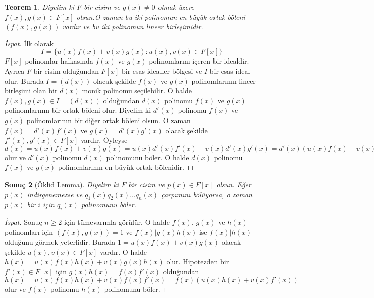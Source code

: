 \documentclass{article}
\newtheorem{thm}{Teorem}[section]
\newtheorem{cor}[thm]{Sonuç}
\theoremstyle{definition}
\theoremstyle{remark}
\begin{document}
    		\begin{thm}
    		    Diyelim ki $F$ bir cisim ve $g(x) \neq 0$ olmak üzere $f(x), g(x) \in F[x]$ olsun.O zaman bu iki polinomun en büyük ortak böleni $(f(x), g(x))$ vardır ve bu iki polinomun lineer birleşimidir.
    		\end{thm}
    		
    		\begin{proof}[İspat]
    		    İlk olarak
    		    \begin{equation*}
    		        I = \{u(x)f(x) + v(x)g(x) : u(x), v(x) \in F[x]\}
    		    \end{equation*}
    		    $F[x]$ polinomlar halkasında $f(x)$ ve $g(x)$ polinomlarını içeren bir idealdir. Ayrıca $F$ bir cisim olduğundan $F[x]$ bir esas idealler bölgesi ve $I$ bir esas ideal olur. Burada $I = (d(x))$ olacak şekilde $f(x)$ ve $g(x)$ polinomlarının lineer birleşimi olan bir $d(x)$ monik polinomu seçilebilir. O halde $f(x), g(x) \in I = (d(x))$ olduğundan $d(x)$ polinomu $f(x)$ ve $g(x)$ polinomlarının bir ortak böleni olur. Diyelim ki $d'(x)$ polinomu $f(x)$ ve $g(x)$ polinomlarının bir diğer ortak böleni olsun. O zaman $f(x) = d'(x)f'(x)$ ve $g(x) = d'(x)g'(x)$ olacak şekilde $f'(x), g'(x) \in F[x]$ vardır. Öyleyse $d(x) = u(x)f(x) + v(x)g(x) = u(x)d'(x)f'(x) + v(x)d'(x)g'(x) = d'(x)(u(x)f(x) + v(x)g(x))$ olur ve $d'(x)$ polinomu $d(x)$ polinomunu böler. O halde $d(x)$ polinomu $f(x)$ ve $g(x)$ polinomlarının en büyük ortak bölenidir.
    		\end{proof}
    		
    		\begin{cor}[Öklid Lemma]\label{2.6}
    		    Diyelim ki $F$ bir cisim ve $p(x) \in F[x]$ olsun. Eğer $p(x)$ indirgenemezse ve $q_1(x) q_2(x) \dots q_n(x)$ çarpımını bölüyorsa, o zaman $p(x)$ bir $i$ için $q_i(x)$ polinomunu böler.
    		\end{cor}
    		
    		\begin{proof}[İspat]
    		    Sonuç $n \geq 2$ için tümevarımla görülür. O halde $f(x)$, $g(x)$ ve $h(x)$ polinomları için $(f(x), g(x)) = 1$ ve $f(x) | g(x)h(x)$ ise $f(x) | h(x)$ olduğunu görmek yeterlidir. Burada $1 = u(x)f(x) + v(x)g(x)$ olacak şekilde $u(x), v(x) \in F[x]$ vardır. O halde $h(x) = u(x)f(x)h(x) + v(x)g(x)h(x)$ olur. Hipotezden bir $f'(x) \in F[x]$ için $g(x)h(x) = f(x)f'(x)$ olduğundan $h(x) = u(x)f(x)h(x) + v(x)f(x)f'(x) = f(x)(u(x)h(x) + v(x)f'(x))$ olur ve $f(x)$ polinomu $h(x)$ polinomunu böler.
    		\end{proof}
    		
\end{document}
